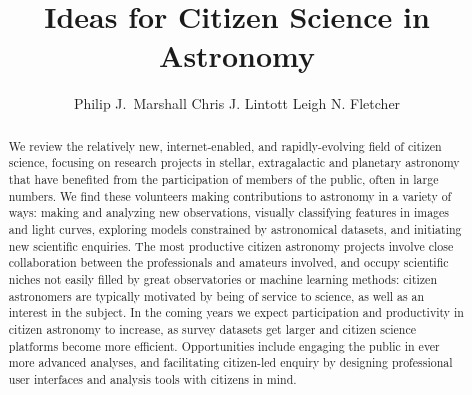 \documentclass{ar2e}
\def\url#1{\texttt{#1}}
\begin{document}

\jvol{}
\ARinfo{}

\title{Ideas for Citizen Science in Astronomy}

\author{%
Philip J.\ Marshall
Chris J. Lintott
Leigh N. Fletcher
}




\begin{abstract} 

We review the relatively new, internet-enabled, and rapidly-evolving field of
citizen science, focusing on research projects in stellar, extragalactic and 
planetary astronomy that have benefited from the participation of members of
the public, often in large numbers. We find these volunteers making
contributions to astronomy in a variety of ways: making and analyzing new
observations, visually classifying features in images and light curves,
exploring models constrained by astronomical datasets, and initiating new
scientific enquiries.  The most productive citizen astronomy projects involve
close collaboration between the professionals and amateurs involved, and occupy
scientific niches not easily filled by great observatories or machine learning
methods: citizen astronomers are typically motivated by being of service to
science, as well as an interest in the subject. In the coming years we expect participation and productivity in citizen
astronomy to increase, as survey datasets get larger and citizen science
platforms become more efficient. Opportunities include engaging the public in
ever more advanced analyses, and facilitating citizen-led enquiry by designing
professional user interfaces and analysis tools with citizens in mind.


\end{abstract}
\end{document}
